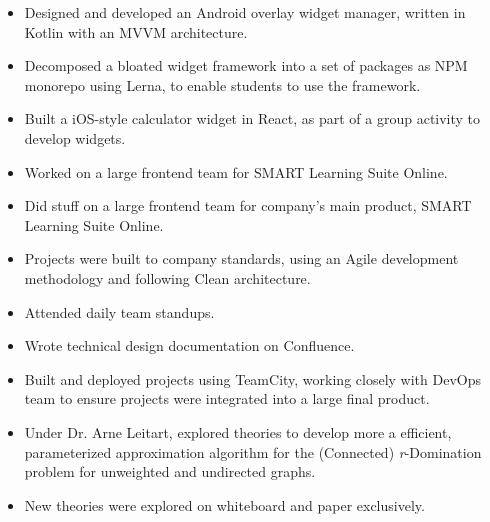 \documentclass[11pt, a4paper]{article}
\begin{document}
\noindent
{
  \hfill
}
\vspace{-0.08in}
\begin{itemize}
  \item Designed and developed an Android overlay widget manager, written in Kotlin with an MVVM architecture.
        \vspace{-0.1in}
  \item Decomposed a bloated widget framework into a set of packages as NPM monorepo using Lerna, to enable students to use the framework.
        \vspace{-0.1in}
  \item Built a iOS-style calculator widget in React, as part of a group activity to develop widgets.
        \vspace{-0.1in}
  \item Worked on a large frontend team for SMART Learning Suite Online.
        \vspace{-0.1in}
  \item Did stuff on a large frontend team for company's main product, SMART Learning Suite Online.
        \vspace{-0.1in}
  \item Projects were built to company standards, using an Agile development methodology and following Clean architecture.
        \vspace{-0.1in}
  \item Attended daily team standups.
        \vspace{-0.1in}
  \item Wrote technical design documentation on Confluence.
        \vspace{-0.1in}
  \item Built and deployed projects using TeamCity, working closely with DevOps team to ensure projects were integrated into a large final product.
\end{itemize}
\vspace{-0.05in}

\noindent
{
  \hfill
}

\noindent
{
  \hfill
}
\vspace{-0.08in}
\begin{itemize}
  \item Under Dr. Arne Leitart, explored theories to develop more a efficient, parameterized
        approximation algorithm for the (Connected) {\it r}-Domination problem for unweighted
        and undirected graphs.
        \vspace{-0.1in}
  \item New theories were explored on whiteboard and paper exclusively.
\end{itemize}
\vspace{-0.05in}
\end{document}
